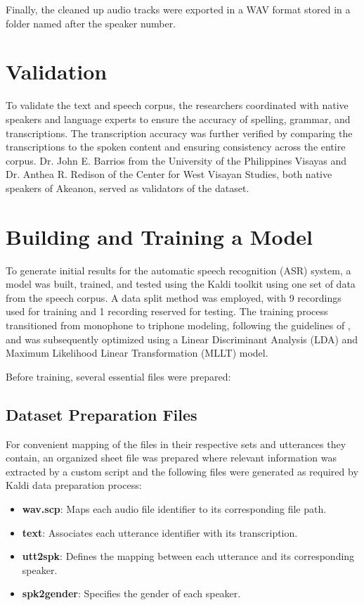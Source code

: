 Finally, the cleaned up audio tracks were exported in a WAV format stored in a folder named after the speaker number.

\section{Validation}

To validate the text and speech corpus, the researchers coordinated with native speakers and language experts to ensure the accuracy of spelling, grammar, and transcriptions. The transcription accuracy was further verified by comparing the transcriptions to the spoken content and ensuring consistency across the entire corpus. Dr. John E. Barrios from the University of the Philippines Visayas and Dr. Anthea R. Redison of the Center for West Visayan Studies, both native speakers of Akeanon, served as validators of the dataset.

\section{Building and Training a Model}

To generate initial results for the automatic speech recognition (ASR) system, a model was built, trained, and tested using the Kaldi toolkit using one set of data from the speech corpus. A data split method was employed, with 9 recordings used for training and 1 recording reserved for testing. The training process transitioned from monophone to triphone modeling, following the guidelines of , and was subsequently optimized using a Linear Discriminant Analysis (LDA) and Maximum Likelihood Linear Transformation (MLLT) model.

Before training, several essential files were prepared:

\subsection{Dataset Preparation Files}

For convenient mapping of the files in their respective sets and utterances they contain, an organized sheet file was prepared where relevant information was extracted by a custom script and the following files were generated as required by Kaldi data preparation process:

\begin{itemize}
    \item \textbf{wav.scp}: Maps each audio file identifier to its corresponding file path.
    \item \textbf{text}: Associates each utterance identifier with its transcription.
    \item \textbf{utt2spk}: Defines the mapping between each utterance and its corresponding speaker.
    \item \textbf{spk2gender}: Specifies the gender of each speaker.
\end{itemize}

